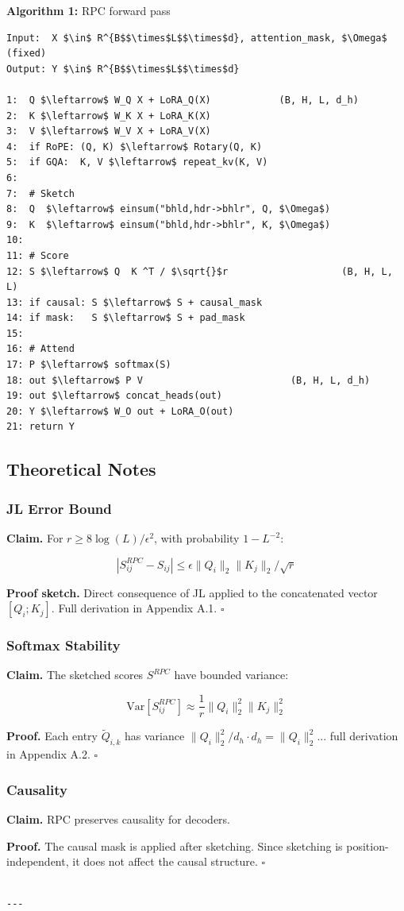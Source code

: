 \textbf{Algorithm 1:} RPC forward pass
\begin{lstlisting}
Input:  X $\in$ R^{B$$\times$L$$\times$d}, attention_mask, $\Omega$ (fixed)
Output: Y $\in$ R^{B$$\times$L$$\times$d}

1:  Q $\leftarrow$ W_Q X + LoRA_Q(X)            (B, H, L, d_h)
2:  K $\leftarrow$ W_K X + LoRA_K(X)
3:  V $\leftarrow$ W_V X + LoRA_V(X)
4:  if RoPE: (Q, K) $\leftarrow$ Rotary(Q, K)
5:  if GQA:  K, V $\leftarrow$ repeat_kv(K, V)
6:
7:  # Sketch
8:  Q  $\leftarrow$ einsum("bhld,hdr->bhlr", Q, $\Omega$)
9:  K  $\leftarrow$ einsum("bhld,hdr->bhlr", K, $\Omega$)
10:
11: # Score
12: S $\leftarrow$ Q  K ^T / $\sqrt{}$r                    (B, H, L, L)
13: if causal: S $\leftarrow$ S + causal_mask
14: if mask:   S $\leftarrow$ S + pad_mask
15:
16: # Attend
17: P $\leftarrow$ softmax(S)
18: out $\leftarrow$ P V                          (B, H, L, d_h)
19: out $\leftarrow$ concat_heads(out)
20: Y $\leftarrow$ W_O out + LoRA_O(out)
21: return Y
\end{lstlisting}

\subsection{Theoretical Notes}

\subsubsection{JL Error Bound}

\textbf{Claim.} For $r \geq 8 \log(L) / \epsilon^2$, with probability $1 - L^{-2}$:

\[
|S^{RPC}_{ij} - S_{ij}| \leq \epsilon \|Q_i\|_2 \|K_j\|_2 / \sqrt{r}
\tag{4.7}
\]

\textbf{Proof sketch.} Direct consequence of JL applied to the concatenated 
vector $[Q_i; K_j]$. Full derivation in Appendix A.1. $\square$

\subsubsection{Softmax Stability}

\textbf{Claim.} The sketched scores $S^{RPC}$ have bounded variance:

\[
\text{Var}[S^{RPC}_{ij}] \approx \frac{1}{r} \|Q_i\|_2^2 \|K_j\|_2^2
\tag{4.8}
\]

\textbf{Proof.} Each entry $\tilde{Q}_{i,k}$ has variance $\|Q_i\|_2^2 / d_h \cdot d_h = \|Q_i\|_2^2$... 
full derivation in Appendix A.2. $\square$

\subsubsection{Causality}

\textbf{Claim.} RPC preserves causality for decoders.

\textbf{Proof.} The causal mask is applied after sketching. Since sketching is 
position-independent, it does not affect the causal structure. $\square$
\begin{lstlisting}

---
\end{lstlisting}